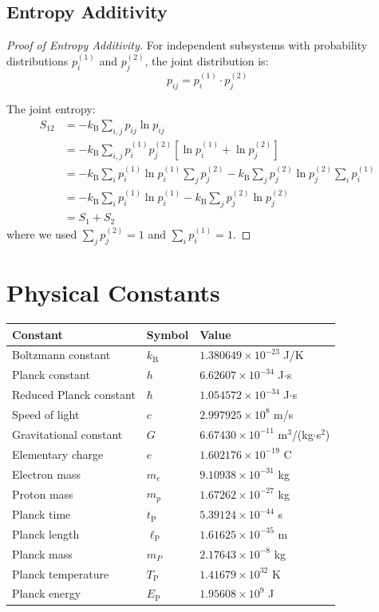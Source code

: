 \documentclass[twocolumn,10pt,twoside]{article}
\newcommand{\kb}{k_{\mathrm{B}}}
\newcommand{\tp}{t_{\mathrm{P}}}
\newcommand{\lp}{\ell_{\mathrm{P}}}
\newcommand{\Ep}{E_{\mathrm{P}}}
\newcommand{\Tp}{T_{\mathrm{P}}}
\begin{document}
\subsection{Entropy Additivity}

\begin{proof}[Proof of Entropy Additivity]
For independent subsystems with probability distributions $p_i^{(1)}$ and $p_j^{(2)}$, the joint distribution is:
\begin{equation}
p_{ij} = p_i^{(1)} \cdot p_j^{(2)}
\end{equation}

The joint entropy:
\begin{align}
S_{12} &= -\kb \sum_{i,j} p_{ij} \ln p_{ij} \\
&= -\kb \sum_{i,j} p_i^{(1)} p_j^{(2)} \left[\ln p_i^{(1)} + \ln p_j^{(2)}\right] \\
&= -\kb \sum_i p_i^{(1)} \ln p_i^{(1)} \sum_j p_j^{(2)} - \kb \sum_j p_j^{(2)} \ln p_j^{(2)} \sum_i p_i^{(1)} \\
&= -\kb \sum_i p_i^{(1)} \ln p_i^{(1)} - \kb \sum_j p_j^{(2)} \ln p_j^{(2)} \\
&= S_1 + S_2
\end{align}
where we used $\sum_j p_j^{(2)} = 1$ and $\sum_i p_i^{(1)} = 1$.
\end{proof}

\section{Physical Constants}

\begin{center}
\begin{tabular}{lll}
\toprule
\textbf{Constant} & \textbf{Symbol} & \textbf{Value} \\
\midrule
Boltzmann constant & $\kb$ & $1.380649 \times 10^{-23}$ J/K \\
Planck constant & $h$ & $6.62607 \times 10^{-34}$ J$\cdot$s \\
Reduced Planck constant & $\hbar$ & $1.054572 \times 10^{-34}$ J$\cdot$s \\
Speed of light & $c$ & $2.997925 \times 10^{8}$ m/s \\
Gravitational constant & $G$ & $6.67430 \times 10^{-11}$ m$^3$/(kg$\cdot$s$^2$) \\
Elementary charge & $e$ & $1.602176 \times 10^{-19}$ C \\
Electron mass & $m_e$ & $9.10938 \times 10^{-31}$ kg \\
Proton mass & $m_p$ & $1.67262 \times 10^{-27}$ kg \\
\midrule
Planck time & $\tp$ & $5.39124 \times 10^{-44}$ s \\
Planck length & $\lp$ & $1.61625 \times 10^{-35}$ m \\
Planck mass & $m_P$ & $2.17643 \times 10^{-8}$ kg \\
Planck temperature & $\Tp$ & $1.41679 \times 10^{32}$ K \\
Planck energy & $\Ep$ & $1.95608 \times 10^{9}$ J \\
\bottomrule
\end{tabular}
\end{center}
\end{document}
